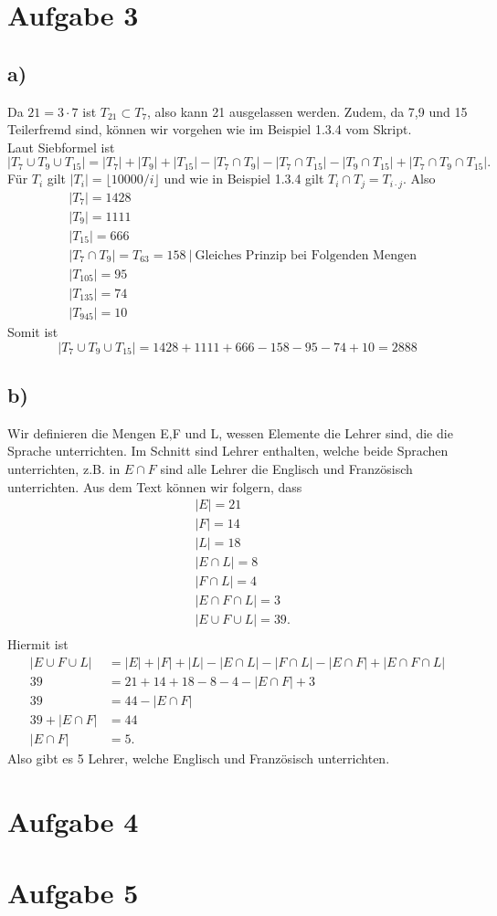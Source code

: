 \documentclass[12pt,german,a4paper]{article}
\begin{document}
\section*{Aufgabe 3}
\subsection*{a)}
Da $21=3\cdot7$ ist $T _{ 21 } \subset T _{ 7 } $, also kann 21 ausgelassen werden. Zudem, da 7,9 und 15 Teilerfremd sind, können wir vorgehen wie im Beispiel 1.3.4 vom Skript. \\
Laut Siebformel ist
$$|T_7\cup T_9\cup T _{ 15 } | = |T_{7}|+|T_{9}|+|T_{15}|-|T_{7}\cap T_{9}|-|T_{7}\cap T_{15}|-|T_{9}\cap T_{15}|+|T_{7}\cap T_{9}\cap T _{ 15 }|.$$
Für $T_i$ gilt $|T_i|=\lfloor 10000/i\rfloor$ und wie in Beispiel 1.3.4 gilt $T_i \cap T_j = T_{i\cdot j}$. Also
\begin{align*}
&|T_{7}|=1428 \\
&|T_{9}|=1111 \\
&|T_{15}|=666 \\
&|T_{7}\cap T_{9}| = T_{63} = 158\ |\ \text{Gleiches Prinzip bei Folgenden Mengen}\\
&|T_{105}|=95 \\
&|T_{135}|=74 \\
&|T_{945}|=10 
\end{align*}
Somit ist
$$
|T_7\cup T_9\cup T _{ 15 } | = 1428+1111+666-158-95-74+10=2888
$$
\subsection*{b)}
Wir definieren die Mengen E,F und L, wessen Elemente die Lehrer sind, die die Sprache unterrichten. Im Schnitt sind Lehrer enthalten, welche beide Sprachen unterrichten, z.B. in $E\cap F$ sind alle Lehrer die Englisch und Französisch unterrichten. Aus dem Text können wir folgern, dass
\begin{align*}
&|E|=21 \\
&|F|=14 \\
&|L|=18 \\
&|E\cap L|=8 \\
&|F\cap L|=4 \\
&|E\cap F\cap L|=3 \\
&|E\cup F\cup L|=39. \\
\end{align*}
Hiermit ist
\begin{align*}
|E\cup F\cup L| &= |E| + |F| + |L| - |E\cap L| - |F\cap L| - |E\cap F| + |E\cap F\cap L| \\
39 &= 21+14+18-8-4-|E\cap F|+3 \\
39 &= 44 -|E\cap F| \\
39+|E\cap F| &= 44 \\
|E\cap F| &= 5.
\end{align*}
Also gibt es 5 Lehrer, welche Englisch und Französisch unterrichten.
\pagebreak
\section*{Aufgabe 4}
\pagebreak
\section*{Aufgabe 5}
\end{document}
